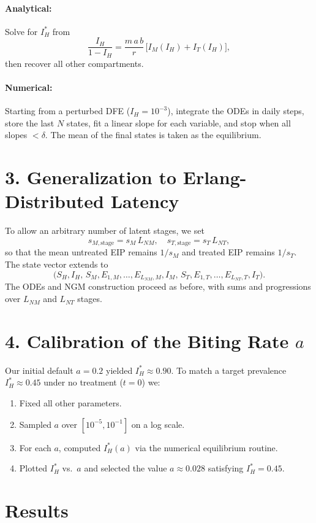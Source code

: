 \documentclass[11pt]{article}
\begin{document}
\paragraph{Analytical:}
Solve for $I_H^*$ from
\[
\frac{I_H}{1-I_H}
=\frac{m\,a\,b}{r}\,\bigl[I_M(I_H)+I_T(I_H)\bigr],
\]
then recover all other compartments.

\paragraph{Numerical:}
Starting from a perturbed DFE ($I_H=10^{-3}$), integrate the ODEs in daily steps, store the last $N$ states, fit a linear slope for each variable, and stop when all slopes $<\delta$.  The mean of the final states is taken as the equilibrium.

\section*{3. Generalization to Erlang-Distributed Latency}
To allow an arbitrary number of latent stages, we set
\[
s_{M,\mathrm{stage}} = s_M\,L_{NM}, 
\quad
s_{T,\mathrm{stage}} = s_T\,L_{NT},
\]
so that the mean untreated EIP remains $1/s_M$ and treated EIP remains $1/s_T$.  The state vector extends to
\[
\bigl(S_H,I_H,\,S_M,E_{1,M},\dots,E_{L_{NM},M},I_M,\,
S_T,E_{1,T},\dots,E_{L_{NT},T},I_T\bigr).
\]
The ODEs and NGM construction proceed as before, with sums and progressions over $L_{NM}$ and $L_{NT}$ stages.

\section*{4. Calibration of the Biting Rate $a$}
Our initial default $a=0.2$ yielded $I_H^*\approx0.90$.  To match a target prevalence $I_H^*\approx0.45$ under no treatment ($t=0$) we:
\begin{enumerate}
  \item Fixed all other parameters.
  \item Sampled $a$ over $[10^{-5},10^{-1}]$ on a log scale.
  \item For each $a$, computed $I_H^*(a)$ via the numerical equilibrium routine.
  \item Plotted $I_H^*$ vs.\ $a$ and selected the value $a\approx0.028$ satisfying $I_H^*=0.45$.
\end{enumerate}

\pagebreak

\section*{Results}
\end{document}
